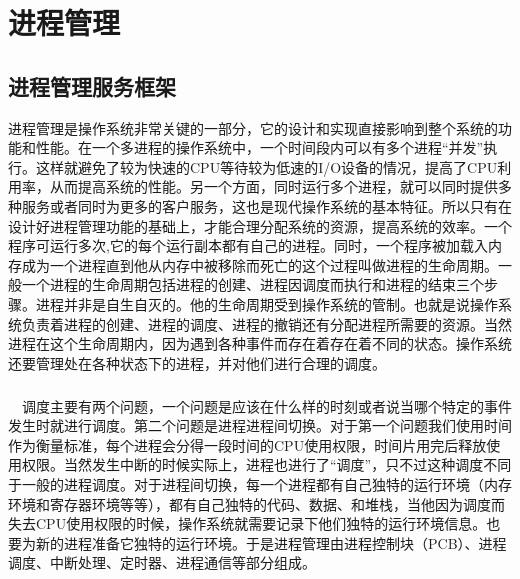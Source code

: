 \documentclass[UTF8,nofonts,cs4size]{ctexrep}
\begin{document}
\chapter{进程管理}
\section{进程管理服务框架}
进程管理是操作系统非常关键的一部分，它的设计和实现直接影响到整个系统的功能和性能。在一个多进程的操作系统中，一个时间段内可以有多个进程“并发”执行。这样就避免了较为快速的CPU等待较为低速的I/O设备的情况，提高了CPU利用率，从而提高系统的性能。另一个方面，同时运行多个进程，就可以同时提供多种服务或者同时为更多的客户服务，这也是现代操作系统的基本特征。所以只有在设计好进程管理功能的基础上，才能合理分配系统的资源，提高系统的效率。一个程序可运行多次,它的每个运行副本都有自己的进程。同时，一个程序被加载入内存成为一个进程直到他从内存中被移除而死亡的这个过程叫做进程的生命周期。一般一个进程的生命周期包括进程的创建、进程因调度而执行和进程的结束三个步骤。进程并非是自生自灭的。他的生命周期受到操作系统的管制。也就是说操作系统负责着进程的创建、进程的调度、进程的撤销还有分配进程所需要的资源。当然进程在这个生命周期内，因为遇到各种事件而存在着存在着不同的状态。操作系统还要管理处在各种状态下的进程，并对他们进行合理的调度。
\paragraph{}
\indent \ \ 
调度主要有两个问题，一个问题是应该在什么样的时刻或者说当哪个特定的事件发生时就进行调度。第二个问题是进程进程间切换。对于第一个问题我们使用时间作为衡量标准，每个进程会分得一段时间的CPU使用权限，时间片用完后释放使用权限。当然发生中断的时候实际上，进程也进行了“调度”，只不过这种调度不同于一般的进程调度。对于进程间切换，每一个进程都有自己独特的运行环境（内存环境和寄存器环境等等），都有自己独特的代码、数据、和堆栈，当他因为调度而失去CPU使用权限的时候，操作系统就需要记录下他们独特的运行环境信息。也要为新的进程准备它独特的运行环境。于是进程管理由进程控制块（PCB）、进程调度、中断处理、定时器、进程通信等部分组成。
\end{document}
